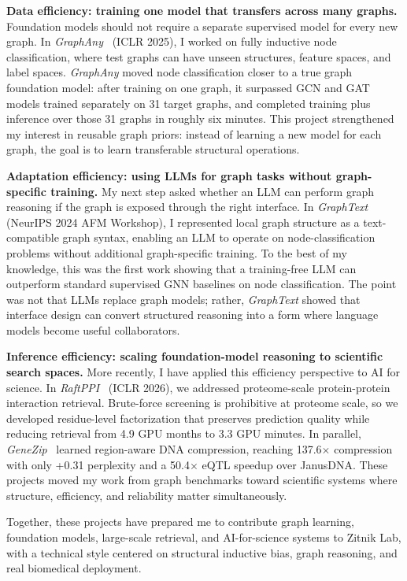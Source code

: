\documentclass[10pt,letterpaper]{article}
\begin{document}
\textbf{Data efficiency: training one model that transfers across many graphs.} Foundation models should not require a separate supervised model for every new graph. In \textit{GraphAny}~\cite{graphany} (ICLR 2025), I worked on fully inductive node classification, where test graphs can have unseen structures, feature spaces, and label spaces. \textit{GraphAny} moved node classification closer to a true graph foundation model: after training on one graph, it surpassed GCN and GAT models trained separately on 31 target graphs, and completed training plus inference over those 31 graphs in roughly six minutes. This project strengthened my interest in reusable graph priors: instead of learning a new model for each graph, the goal is to learn transferable structural operations.

\textbf{Adaptation efficiency: using LLMs for graph tasks without graph-specific training.} My next step asked whether an LLM can perform graph reasoning if the graph is exposed through the right interface. In \textit{GraphText}~\cite{graphtext} (NeurIPS 2024 AFM Workshop), I represented local graph structure as a text-compatible graph syntax, enabling an LLM to operate on node-classification problems without additional graph-specific training. To the best of my knowledge, this was the first work showing that a training-free LLM can outperform standard supervised GNN baselines on node classification. The point was not that LLMs replace graph models; rather, \textit{GraphText} showed that interface design can convert structured reasoning into a form where language models become useful collaborators.

\textbf{Inference efficiency: scaling foundation-model reasoning to scientific search spaces.} More recently, I have applied this efficiency perspective to AI for science. In \textit{RaftPPI}~\cite{raftppi} (ICLR 2026), we addressed proteome-scale protein-protein interaction retrieval. Brute-force screening is prohibitive at proteome scale, so we developed residue-level factorization that preserves prediction quality while reducing retrieval from 4.9 GPU months to 3.3 GPU minutes. In parallel, \textit{GeneZip}~\cite{genezip} learned region-aware DNA compression, reaching 137.6$\times$ compression with only +0.31 perplexity and a 50.4$\times$ eQTL speedup over JanusDNA. These projects moved my work from graph benchmarks toward scientific systems where structure, efficiency, and reliability matter simultaneously.

Together, these projects have prepared me to contribute graph learning, foundation models, large-scale retrieval, and AI-for-science systems to Zitnik Lab, with a technical style centered on structural inductive bias, graph reasoning, and real biomedical deployment.
\end{document}
